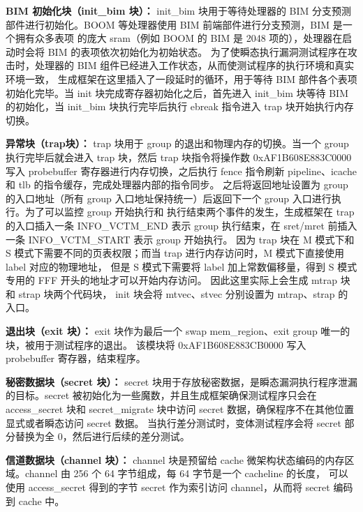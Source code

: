 \textbf{BIM 初始化块（init\_bim 块）：}
init\_bim 块用于等待处理器的 BIM 分支预测部件进行初始化。BOOM 等处理器使用 BIM 前端部件进行分支预测，BIM 是一个拥有众多表项
的庞大 sram（例如 BOOM 的 BIM 是 2048 项的），处理器在启动时会将 BIM 的表项依次初始化为初始状态。
为了使瞬态执行漏洞测试程序在攻击时，处理器的 BIM 组件已经进入工作状态，从而使测试程序的执行环境和真实环境一致，
生成框架在这里插入了一段延时的循环，用于等待 BIM 部件各个表项初始化完毕。当 init 块完成寄存器初始化之后，首先进入
init\_bim 块等待 BIM 的初始化，当 init\_bim 块执行完毕后执行 ebreak 指令进入 trap 块开始执行内存切换。\par

\textbf{异常块（trap块）：}
trap 块用于 group 的退出和物理内存的切换。当一个 group 执行完毕后就会进入 trap 块，然后 trap 块指令将操作数 0xAF1B608E883C0000
写入 probebuffer 寄存器进行内存切换，之后执行 fence 指令刷新 pipeline、icache 和 tlb 的指令缓存，完成处理器内部的指令同步。
之后将返回地址设置为 group 的入口地址（所有 group 入口地址保持统一）后返回下一个 group 入口进行执行。为了可以监控 group 开始执行和
执行结束两个事件的发生，生成框架在 trap 的入口插入一条 INFO\_VCTM\_END 表示 group 执行结束，在 sret/mret 前插入一条 INFO\_VCTM\_START 表示 group 开始执行。
因为 trap 块在 M 模式下和 S 模式下需要不同的页表权限；而当 trap 进行内存访问时，M 模式下直接使用 label 对应的物理地址，
但是 S 模式下需要将 label 加上常数偏移量，得到 S 模式专用的 FFF 开头的地址才可以开始内存访问。
因此这里实际上会生成 mtrap 块和 strap 块两个代码块，
init 块会将 mtvec、stvec 分别设置为 mtrap、strap 的入口。\par

\textbf{退出块（exit 块）：}
exit 块作为最后一个 swap mem\_region、exit group 唯一的块，被用于测试程序的退出。
该模块将 0xAF1B608E883CB0000 写入 probebuffer 寄存器，结束程序。\par

\textbf{秘密数据块（secret 块）：}
secret 块用于存放秘密数据，是瞬态漏洞执行程序泄漏的目标。secret 被初始化为一些魔数，并且生成框架确保测试程序只会在
 access\_secret 块和 secret\_migrate 块中访问 secret 数据，确保程序不在其他位置显式或者瞬态访问 secret 数据。
当执行差分测试时，变体测试程序会将 secret 部分替换为全 0，然后进行后续的差分测试。\par

\textbf{信道数据块（channel 块）：}
channel 块是预留给 cache 微架构状态编码的内存区域。channel 由 256 个 64 字节组成，每 64 字节是一个 cacheline 的长度，
可以使用 access\_secret 得到的字节 secret 作为索引访问 channel，从而将 secret 编码到 cache 中。\par

